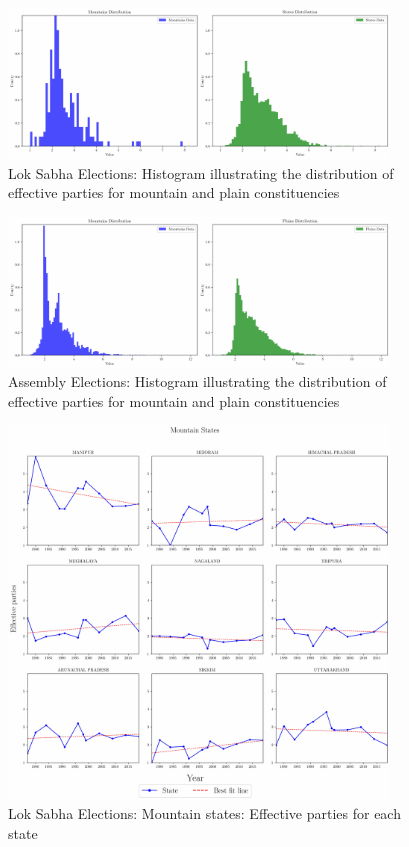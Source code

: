 \begin{figure}[htbp]
    \centering
    \includegraphics[width=0.9\textwidth]{figures/lok/histogram.pdf}
    \caption{Lok Sabha Elections: Histogram illustrating the distribution of effective parties for mountain and plain constituencies}
    \label{img:histogram}
\end{figure}

\begin{figure}[htbp]
    \centering
    \includegraphics[width=0.9\textwidth]{figures/assembly/histogram.pdf}
    \caption{Assembly Elections: Histogram illustrating the distribution of effective parties for mountain and plain constituencies}
\label{img:assembly_histogram}
\end{figure}


\begin{figure}[htbp]
    \centering
    \includegraphics[width=0.9\textwidth]{figures/lok/mountain_states.pdf}
    \caption{Lok Sabha Elections: Mountain states: Effective parties for each state}
    \label{img:mountain_enp}
\end{figure}

